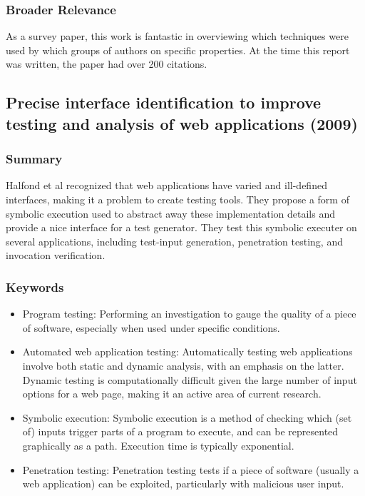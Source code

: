\documentclass{sig-alternate-05-2015}
\begin{document}
\subsubsection{Broader Relevance}
As a survey paper, this work is fantastic in overviewing which techniques were used by which groups of authors on specific properties. At the time this report was written, the paper had over 200 citations.

\subsection{Precise interface identification to improve testing and analysis of web applications (2009)}

\subsubsection{Summary}
Halfond et al \cite{halfond2009precise} recognized that web applications have varied and ill-defined interfaces, making it a problem to create testing tools. They propose a form of symbolic execution used to abstract away these implementation details and provide a nice interface for a test generator. They test this symbolic executer on several applications, including test-input generation, penetration testing, and invocation verification.  

\subsubsection{Keywords}

\begin{itemize}
\item Program testing: Performing an investigation to gauge the quality of a piece of software, especially when used under specific conditions.
\item Automated web application testing: Automatically testing web applications involve both static and dynamic analysis, with an emphasis on the latter. Dynamic testing is computationally difficult given the large number of input options for a web page, making it an active area of current research.
\item Symbolic execution: Symbolic execution is a method of checking which (set of) inputs trigger parts of a program to execute, and can be represented graphically as a path. Execution time is typically exponential.
\item Penetration testing: Penetration testing tests if a piece of software (usually a web application) can be exploited, particularly with malicious user input.
\end{itemize}
\end{document}
